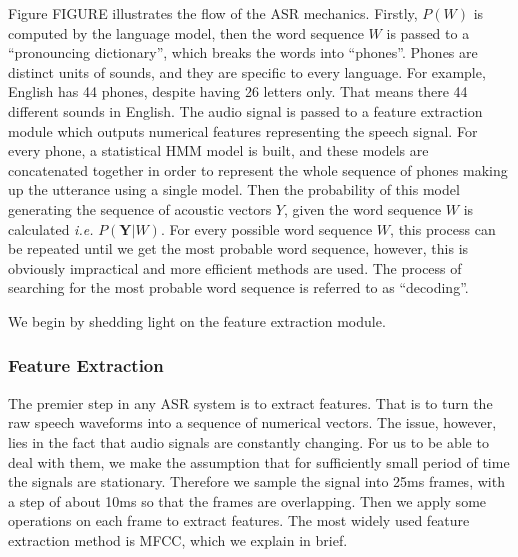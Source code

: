 Figure FIGURE illustrates the flow of the \ac{ASR} mechanics. Firstly, $P(W)$ is computed by the language model, then the word sequence $W$ is passed to a \enquote{pronouncing dictionary}, which breaks the words into \enquote{phones}. Phones are distinct units of sounds, and they are specific to every language. For example, English has 44 phones, despite having 26 letters only. That means there 44 different sounds in English. The audio signal is passed to a feature extraction module which outputs numerical features representing the speech signal. For every phone, a statistical \ac{HMM} model is built, and these models are concatenated together in order to represent the whole sequence of phones making up the utterance using a single model. Then the probability of this model generating the sequence of acoustic vectors $Y$, given the word sequence $W$ is calculated \textit{i.e.} $P(\mathbf{Y}|W)$. For every possible word sequence $W$, this process can be repeated until we get the most probable word sequence, however, this is obviously impractical and more efficient methods are used. The process of searching for the most probable word sequence is referred to as \enquote{decoding}.

We begin by shedding light on the feature extraction module.


\subsubsection{Feature Extraction} 
\label{bg:s3_sub1_subsub1}



The premier step in any \ac{ASR} system is to extract features. That is to turn the raw speech waveforms into a sequence of numerical vectors. The issue, however, lies in the fact that audio signals are constantly changing. For us to be able to deal with them, we make the assumption that for sufficiently small period of time the signals are stationary. Therefore we sample the signal into 25ms frames, with a step of about 10ms so that the frames are overlapping. Then we apply some operations on each frame to extract features. The most widely used feature extraction method is \ac{MFCC}, which we explain in brief.

